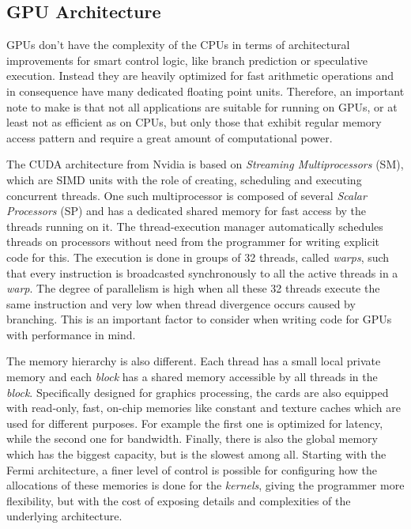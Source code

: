 \subsection{GPU Architecture}

GPUs don't have the complexity of the CPUs in terms of architectural
improvements for smart control logic, like branch prediction or speculative
execution. Instead they are heavily optimized for fast arithmetic operations and
in consequence have many dedicated floating point units. Therefore, an important
note to make is that not all applications are suitable for running on GPUs, or
at least not as efficient as on CPUs, but only those that exhibit regular memory
access pattern and require a great amount of computational power.

The CUDA architecture from Nvidia is based on \textit{Streaming Multiprocessors}
(SM), which are SIMD units with the role of creating, scheduling and executing
concurrent threads. One such multiprocessor is composed of several
\textit{Scalar Processors} (SP) and has a dedicated shared memory for fast
access by the threads running on it. The thread-execution manager automatically
schedules threads on processors without need from the programmer for writing
explicit code for this. The execution is done in groups of 32 threads, called
\textit{warps}, such that every instruction is broadcasted synchronously to all
the active threads in a \textit{warp}. The degree of parallelism is high when
all these 32 threads execute the same instruction and very low when thread
divergence occurs caused by branching. This is an important factor to consider
when writing code for GPUs with performance in mind.

The memory hierarchy is also different. Each thread has a small local private
memory and each \textit{block} has a shared memory accessible by all threads in
the \textit{block}. Specifically designed for graphics processing, the cards are
also equipped with read-only, fast, on-chip memories like constant and texture
caches which are used for different purposes. For example the first one is
optimized for latency, while the second one for bandwidth. Finally, there is
also the global memory which has the biggest capacity, but is the slowest among
all. Starting with the Fermi architecture, a finer level of control is possible
for configuring how the allocations of these memories is done for the
\textit{kernels}, giving the programmer more flexibility, but with the cost of
exposing details and complexities of the underlying architecture.

